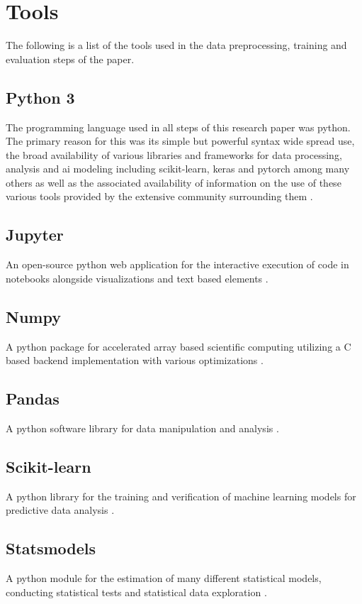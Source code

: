 \section{Tools}\label{Tools}

The following is a list of the tools used in the data preprocessing, training and evaluation steps of the paper.

\subsection*{Python 3}\label{Python 3}

The programming language used in all steps of this research paper was python. The primary reason for this was its simple but powerful syntax wide spread use, the broad availability of various libraries and frameworks for data processing, analysis and \gls{ai} modeling including scikit-learn, keras and pytorch among many others as well as the associated availability of information on the use of these various tools provided by the extensive community surrounding them \cite{python}.

\subsection*{Jupyter}\label{Jupyter}

An open-source python web application for the interactive execution of code in notebooks alongside visualizations and text based elements \cite{jupyter}.

\subsection*{Numpy}\label{Numpy}

A python package for accelerated array based scientific computing utilizing a C based backend implementation with various optimizations \cite{numpy}.

\subsection*{Pandas}\label{Pandas}

A python software library for data manipulation and analysis \cite{pandas}.

\subsection*{Scikit-learn}\label{Scikit-learn}

A python library for the training and verification of machine learning models for predictive data analysis \cite{scikit-learn}.

\subsection*{Statsmodels}\label{Statsmodels}

A python module for the estimation of many different statistical models, conducting statistical tests and statistical data exploration \cite{statsmodels}.

